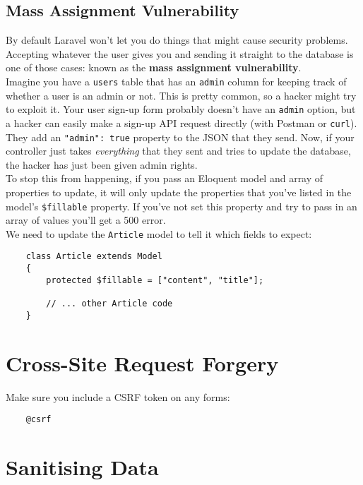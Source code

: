 \subsection{Mass Assignment Vulnerability}

By default Laravel won't let you do things that might cause security problems. Accepting whatever the user gives you and sending it straight to the database is one of those cases: known as the \textbf{mass assignment vulnerability}.
\\

Imagine you have a \texttt{users} table that has an \texttt{admin} column for keeping track of whether a user is an admin or not. This is pretty common, so a hacker might try to exploit it. Your user sign-up form probably doesn't have an \texttt{admin} option, but a hacker can easily make a sign-up API request directly (with Postman or \texttt{curl}). They add an \texttt{"admin": true} property to the JSON that they send. Now, if your controller just takes \textit{everything} that they sent and tries to update the database, the hacker has just been given admin rights.
\\

To stop this from happening, if you pass an Eloquent model and array of properties to update, it will only update the properties that you've listed in the model's \texttt{\$fillable} property. If you've not set this property and try to pass in an array of values you'll get a 500 error.
\\

We need to update the \texttt{Article} model to tell it which fields to expect:

\begin{verbatim}
    class Article extends Model
    {
        protected $fillable = ["content", "title"];

        // ... other Article code
    }
\end{verbatim}

\section{Cross-Site Request Forgery}

Make sure you include a CSRF token on any forms:

\begin{verbatim}
    @csrf
\end{verbatim}

\section{Sanitising Data}

